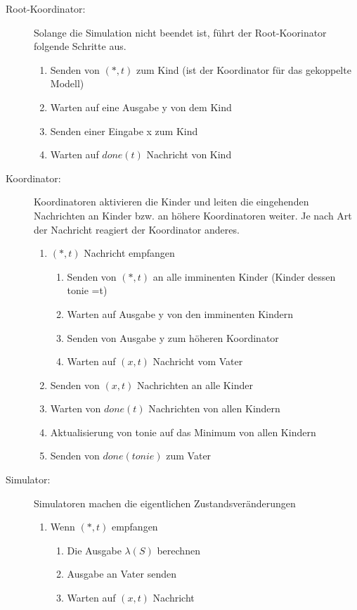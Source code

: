 \documentclass[11pt, fleqn, a4paper, leqno]{scrartcl} %
\begin{document}
	\begin{description}
	 	\item[Root-Koordinator:] Solange die Simulation nicht beendet ist, führt der Root-Koorinator folgende Schritte aus.
	 		\begin{enumerate}
		 		\item Senden von $(*,t)$ zum Kind (ist der Koordinator für das gekoppelte Modell)
		 		\item Warten auf eine Ausgabe y von dem Kind
		 		\item Senden einer Eingabe x zum Kind
		 		\item Warten auf $done(t)$ Nachricht von Kind
	 		\end{enumerate}
	 	\item[Koordinator:] Koordinatoren aktivieren die Kinder und leiten die eingehenden Nachrichten an Kinder bzw. an höhere Koordinatoren weiter. Je nach Art der Nachricht reagiert der Koordinator anderes.
	 		\begin{enumerate}
	 			\item $(*,t)$ Nachricht empfangen
	 				\begin{enumerate}
		 				\item Senden von $(*,t)$ an alle imminenten Kinder (Kinder dessen tonie =t)
		 				\item Warten auf Ausgabe y von den imminenten Kindern
		 				\item Senden von Ausgabe y zum höheren Koordinator
		 				\item Warten auf $(x,t)$ Nachricht vom Vater
	 				\end{enumerate}
	 			\item Senden von $(x,t)$ Nachrichten an alle Kinder
	 			\item Warten von $done(t)$ Nachrichten von allen Kindern
	 			\item Aktualisierung von tonie auf das Minimum von allen Kindern
	 			\item Senden von $done(tonie)$ zum Vater
	 		\end{enumerate}
	 	\item[Simulator:] Simulatoren machen die eigentlichen Zustandsveränderungen
	 		\begin{enumerate}
		 		\item Wenn $(*,t)$ empfangen
		 			\begin{enumerate}
			 			\item Die Ausgabe $\lambda(S)$ berechnen
			 			\item Ausgabe an Vater senden
			 			\item Warten auf $(x,t)$ Nachricht 

\end{enumerate}
\end{enumerate}
\end{description}
\end{document}
